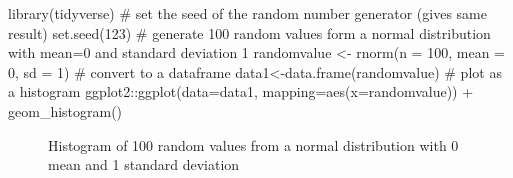 \documentclass[
  letterpaper,
  DIV=11,
  numbers=noendperiod]{scrartcl}
\newenvironment{Shaded}{\begin{snugshade}}{\end{snugshade}}
\newcommand{\AttributeTok}[1]{\textcolor[rgb]{0.40,0.45,0.13}{#1}}
\newcommand{\CommentTok}[1]{\textcolor[rgb]{0.37,0.37,0.37}{#1}}
\newcommand{\DecValTok}[1]{\textcolor[rgb]{0.68,0.00,0.00}{#1}}
\newcommand{\FunctionTok}[1]{\textcolor[rgb]{0.28,0.35,0.67}{#1}}
\newcommand{\NormalTok}[1]{\textcolor[rgb]{0.00,0.23,0.31}{#1}}
\newcommand{\OtherTok}[1]{\textcolor[rgb]{0.00,0.23,0.31}{#1}}
\newcommand{\SpecialCharTok}[1]{\textcolor[rgb]{0.37,0.37,0.37}{#1}}
\begin{document}
\begin{Shaded}
\begin{Highlighting}[]
\FunctionTok{library}\NormalTok{(tidyverse)}
\CommentTok{\# set the seed of the random number generator (gives same result)}
\FunctionTok{set.seed}\NormalTok{(}\DecValTok{123}\NormalTok{)}
\CommentTok{\# generate 100 random values form a normal distribution with mean=0 and standard deviation 1}
\NormalTok{randomvalue }\OtherTok{\textless{}{-}} \FunctionTok{rnorm}\NormalTok{(}\AttributeTok{n =} \DecValTok{100}\NormalTok{, }\AttributeTok{mean =} \DecValTok{0}\NormalTok{, }\AttributeTok{sd =} \DecValTok{1}\NormalTok{)}
\CommentTok{\# convert to a dataframe}
\NormalTok{data1}\OtherTok{\textless{}{-}}\FunctionTok{data.frame}\NormalTok{(randomvalue)}
\CommentTok{\# plot as a histogram}
\NormalTok{ggplot2}\SpecialCharTok{::}\FunctionTok{ggplot}\NormalTok{(}\AttributeTok{data=}\NormalTok{data1, }
                \AttributeTok{mapping=}\FunctionTok{aes}\NormalTok{(}\AttributeTok{x=}\NormalTok{randomvalue)) }\SpecialCharTok{+}
  \FunctionTok{geom\_histogram}\NormalTok{()}
\end{Highlighting}
\end{Shaded}

\begin{figure}[H]


\caption{\label{fig-histogram}Histogram of 100 random values from a
normal distribution with 0 mean and 1 standard deviation}

\end{figure}%
\end{document}
